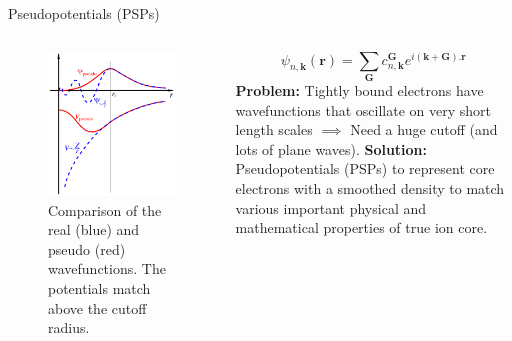 \documentclass[aspectratio=169]{beamer}
\let \vec \mathbf
\begin{document}
    \begin{frame}{Pseudopotentials (PSPs)}
        \begin{columns}


            \begin{figure}
                \centering
                \includegraphics[width=0.6\linewidth]{lectures/figures/7_Pseudopotentials.png}
                \caption{Comparison of the real (blue) and pseudo (red) wavefunctions. The potentials match above the cutoff radius.}
            \end{figure}

            \begin{equation*}
                \psi_{n,\vec{k}}(\vec{r}) = \sum_{\vec{G}} c^{\vec{G}}_{n,\vec{k}} e^{i(\vec{k}+\vec{G}).\vec{r}}
            \end{equation*}
            \textbf{Problem: }Tightly bound electrons have wavefunctions that oscillate on very short length scales $\implies$ Need a huge cutoff (and lots of plane waves).\newline
            \newline
            \textbf{Solution:} Pseudopotentials (PSPs) to represent core electrons with a smoothed density to match various important physical and mathematical properties of true ion core.

        \end{columns}
    \end{frame}
\end{document}
